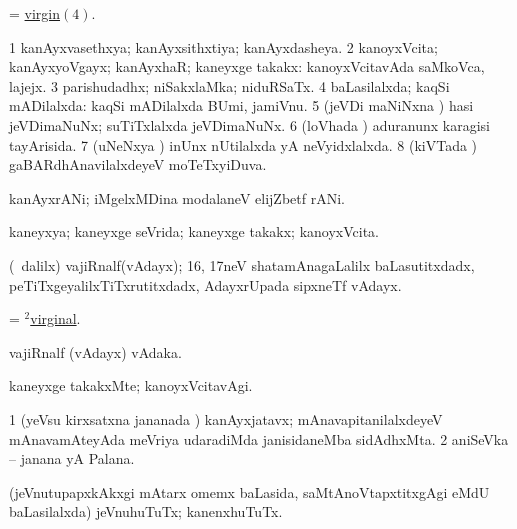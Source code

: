 \noindent 
\gl{\pagu}
\expl{}
\bmng
  = \hyperlink{virgin(4)}{virgin\((4)\)}. 
\emng
\eentry

\bentry
{} 
\gl{\gu}
\expl{}
\bmng
\bnum
\num{1} kanAyxvasethxya; kanAyxsithxtiya; kanAyxdasheya. 
\num{2} kanoyxVcita; kanAyxyoVgayx; kanAyxhaR; kaneyxge takakx:  kanoyxVcitavAda saMkoVca, lajejx. 
\num{3} parishudadhx; niSakxlaMka; niduRSaTx. 
\num{4} baLasilalxda; kaqSi mADilalxda:  kaqSi mADilalxda BUmi, jamiVnu. 
\num{5} (jeVDi maNiNxna \vi) hasi jeVDimaNuNx; suTiTxlalxda jeVDimaNuNx. 
\num{6} (loVhada \vi) aduranunx karagisi tayArisida. 
\num{7} (uNeNxya \vi) inUnx nUtilalxda yA neVyidxlalxda. 
\num{8} (kiVTada \vi) gaBARdhAnavilalxdeyeV moTeTxyiDuva. 
\enum
\emng

\noindent 
\gl{\pagu}
\expl{}
\bmng
  kanAyxrANi; iMgelxMDina modalaneV elijZbetf rANi. 
\emng
\eentry

\bentry 
{} 
\gl{\gu}
\expl{}
\bmng
 kaneyxya; kaneyxge seVrida; kaneyxge takakx; kanoyxVcita. 
\emng
\eentry

\bentry
{} 
\gl{\nA}
\expl{}
\bmng
 (\sA\ \bava dalilx) vajiRnalf(vAdayx); 16, 17neV shatamAnagaLalilx baLasutitxdadx, peTiTxgeyalilxTiTxrutitxdadx, AdayxrUpada sipxneTf  vAdayx.  
\emng

\noindent 
\gl{\pagu}
\expl{}
\bmng
  = \hyperlink{virginal(2)}{$^2$virginal}. 
\emng
\eentry

\bentry
{} 
\gl{\nA}
\expl{}
\bmng
 vajiRnalf (vAdayx) vAdaka. 
\emng
\eentry

\bentry
{} 
\gl{\kirxvi}
\expl{}
\bmng
 kaneyxge takakxMte; kanoyxVcitavAgi. 
\emng
\eentry

\bentry
{}
\gl{\nA}
\expl{}
\bmng
\bnum
\num{1} (yeVsu kirxsatxna jananada \vi) kanAyxjatavx; mAnavapitanilalxdeyeV mAnavamAteyAda meVriya udaradiMda janisidaneMba sidAdhxMta. 
\num{2} aniSeVka -- janana yA Palana. 
\enum
\emng
\eentry

\bentry
{}
\gl{\nA}
\expl{}
\bmng
 (jeVnutupapxkAkxgi mAtarx omemx baLasida, saMtAnoVtapxtitxgAgi eMdU baLasilalxda) jeVnuhuTuTx; kanenxhuTuTx. 
\emng
\eentry

